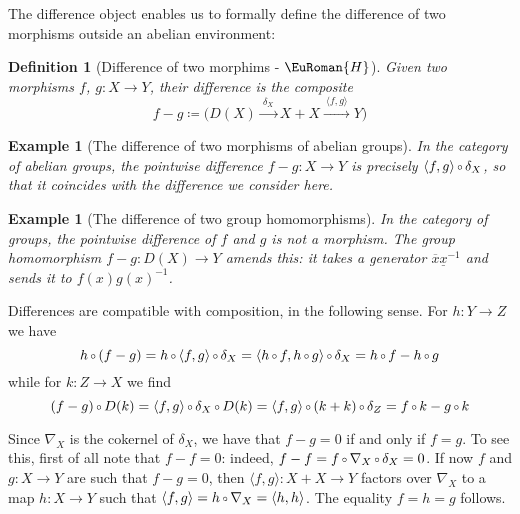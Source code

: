 \documentclass [12pt,oneside]{book}%
\theoremstyle{captionstyle}  %
\newtheorem{definition}[theorem]{Definition}
\newtheorem{example}[theorem]{Example}
\newcommand{\IndSep}{\qquad}
\newcommand{\Defn}[1]{\emph{#1}}
\newcommand{\DefEq}{\coloneq} 		%
\newcommand{\XRA}[1]{\xrightarrow{\ #1\ }}
\newcommand{\from}{\colon}				%
\newcommand{\Comp}{\raisebox{0.1ex}{\ensuremath{\,\scriptstyle{\circ}}\,}}
\newcommand{\FoldOn}[1]{\nabla_{#1}}				%
\newcommand{\SumMapOutOf}[1]{\langle #1\rangle}     %
\newcommand{\HTag}{ - {\color{Brown} $\EuRoman{H}$}}																					%
\begin{document}
The difference object enables us to formally define the difference of two morphisms outside an abelian environment:

\begin{definition}[Difference of two morphims\HTag]
    \label{def:DifferenceMorphisms}%
    Given two morphisms $f$, $g\from X\to Y$, their \Defn{difference} is the composite %
    \index[not]{d!$f-g$\IndSep difference of morphisms}%
    \begin{equation*}
        f-g\DefEq \bigl( D(X) \XRA{\delta_{X}} X+X \XRA{\SumMapOutOf{f,g}}  Y\bigr)
    \end{equation*}
\end{definition}

\begin{example}[The difference of two morphisms of abelian groups]
    \label{exa:Difference-AbGroup-Maps}%
    In the category of abelian groups, the pointwise difference $f-g\from X\to Y$ is precisely $\langle f,g\rangle\Comp \delta_X$, so that it coincides with the difference we consider here.
\end{example}

\begin{example}[The difference of two group homomorphisms]
    \label{exa:Difference-Group-Maps}%
    In the category of groups, the pointwise difference of $f$ and $g$ is not a morphism. The group homomorphism $f-g\from D(X)\to Y$ amends this: it takes a generator $\overline{x}\underline{x}^{-1}$ and sends it to $f(x)g(x)^{-1}$.
\end{example}

Differences are compatible with composition, in the following sense. For $h\from Y\to Z$ we have
\begin{equation*}
    h\Comp (f-g)=h\Comp \langle f,g\rangle\Comp \delta_X = \langle h\Comp f,h\Comp g\rangle\Comp \delta_X=h\Comp f - h\Comp g
\end{equation*}
while for $k\from Z\to X$ we find
\begin{equation*}
    (f-g)\Comp D(k)=\SumMapOutOf{f,g}\Comp \delta_X\Comp D(k)=\SumMapOutOf{f,g}\Comp (k+k)\Comp \delta_Z=f\Comp k-g\Comp k
\end{equation*}

Since $\FoldOn{X}$ is the cokernel of $\delta_X$, we have that $f-g=0$ if and only if $f=g$. To see this, first of all note that $f-f=0$: indeed, $f-f=f\Comp \FoldOn{X}\Comp \delta_X=0$. If now $f$ and $g\from X\to Y$ are such that $f-g=0$, then $\langle f,g\rangle\from X+X\to Y$ factors over $\FoldOn{X}$ to a map $h\from X\to Y$ such that $\SumMapOutOf{f,g}=h \Comp \FoldOn{X}=\SumMapOutOf{h,h}$. The equality $f=h=g$ follows.
\end{document}
